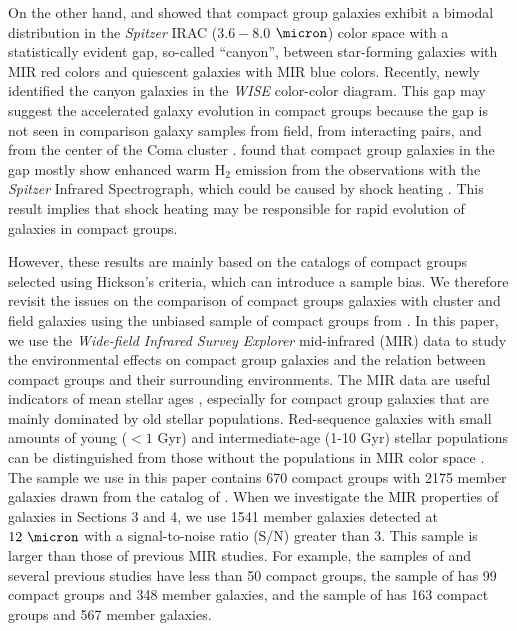 \documentclass[12pt,preprint,apj]{emulateapj}
\begin{document}
On the other hand, \citet{johnson+07} and \citet{walker+10, walker+12} 
showed that compact group galaxies exhibit a bimodal distribution 
in the \textit{Spitzer} IRAC ($3.6-8.0$ $\micron$) color space 
with a statistically evident gap, so-called ``canyon'', 
between star-forming galaxies with MIR red colors 
and quiescent galaxies with MIR blue colors. 
Recently, \citet{zucker+16} newly identified the canyon galaxies in the 
\textit{WISE} color-color diagram.
This gap may suggest the accelerated galaxy evolution in compact groups 
because the gap is not seen in comparison galaxy samples from 
field, from interacting pairs, and from the center of the Coma cluster 
\citep{walker+10,walker+12,walker+13}. 
\citet{cluver+13} found that compact group galaxies in the gap 
mostly show enhanced warm H$_2$ emission from the observations with 
the \textit{Spitzer} Infrared Spectrograph, which could be caused by shock 
heating \citep{appleton+06,cluver+10}. This result implies that shock heating 
may be responsible for rapid evolution of galaxies in compact groups.


However, these results are mainly based on the catalogs of compact groups 
selected using Hickson's criteria, which can introduce a sample bias.
We therefore revisit the issues on the comparison of compact groups galaxies 
with cluster and field galaxies using the unbiased sample of compact groups 
from \citet{sohn+16}.
In this paper, we use the \textit{Wide-field Infrared Survey Explorer}
\citep[\textit{WISE},][]{wright+10} mid-infrared (MIR) data to study 
the environmental effects on compact group galaxies and the relation between 
compact groups and their surrounding environments.
The MIR data are useful indicators of mean stellar ages \citep{piovan+03,ko+09}, 
especially for compact group galaxies that are mainly dominated by old stellar 
populations. Red-sequence galaxies with small amounts of young ($<1$ Gyr) and 
intermediate-age (1-10 Gyr) stellar populations can be distinguished from 
those without the populations in MIR color space \citep{ko+13,ko+16,lee+15}. 
The sample we use in this paper contains 670 compact groups 
with 2175 member galaxies drawn from the catalog of \citet{sohn+16}.
When we investigate the MIR properties of galaxies in Sections 3 and 4, 
we use 1541 member galaxies detected at $12~\micron$ with 
a signal-to-noise ratio (S/N) greater than 3.
This sample is larger than those of previous MIR studies.
For example,
the samples of \citet{walker+12} and several previous studies 
\citep{johnson+07,bitsakis+10,bitsakis+11,walker+10} have less than 50 compact 
groups, the sample of \citet{walker+13} has 99 compact groups and 
348 member galaxies, and 
the sample of \citet{zucker+16} has 163 compact groups and 567 member galaxies.
\end{document}
